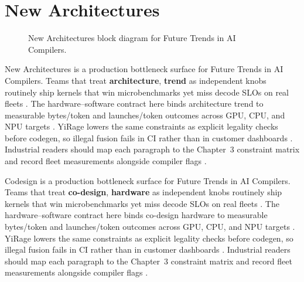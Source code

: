 \section{New Architectures}
\label{sec:new_architectures}
\begin{figure}[t]
\centering
{}
\caption{New Architectures block diagram for Future Trends in AI Compilers.}
\label{fig:new_architectures_architecture}
\end{figure}


New Architectures is a production bottleneck surface for Future Trends in AI Compilers. Teams that treat \textbf{architecture}, \textbf{trend} as independent knobs routinely ship kernels that win microbenchmarks yet miss decode SLOs on real fleets \citep{taxbreak2026,semianalysis2024tma}. The hardware--software contract here binds architecture trend to measurable bytes/token and launches/token outcomes across GPU, CPU, and NPU targets \citep{memoryfloor2026,amd2024xdna}. YiRage lowers the same constraints as explicit legality checks before codegen, so illegal fusion fails in CI rather than in customer dashboards \citep{nvidia2022hopper,amd2024aie}. Industrial readers should map each paragraph to the Chapter~3 constraint matrix and record fleet measurements alongside compiler flags \citep{semianalysis2024tma,dlbook}.

Codesign is a production bottleneck surface for Future Trends in AI Compilers. Teams that treat \textbf{co-design}, \textbf{hardware} as independent knobs routinely ship kernels that win microbenchmarks yet miss decode SLOs on real fleets \citep{liu2024deepseekv3,memoryfloor2026}. The hardware--software contract here binds co-design hardware to measurable bytes/token and launches/token outcomes across GPU, CPU, and NPU targets \citep{patel2025llminference,nvidia2022hopper}. YiRage lowers the same constraints as explicit legality checks before codegen, so illegal fusion fails in CI rather than in customer dashboards \citep{taxbreak2026,semianalysis2024tma}. Industrial readers should map each paragraph to the Chapter~3 constraint matrix and record fleet measurements alongside compiler flags \citep{memoryfloor2026,amd2024xdna}.

